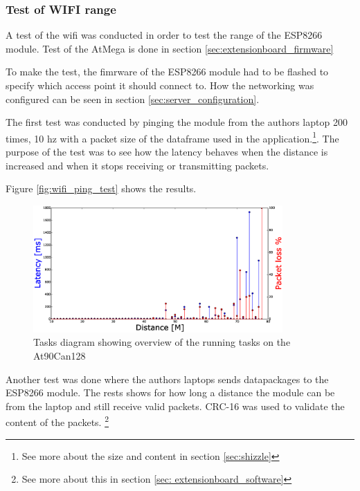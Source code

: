 \subsubsection*{Test of WIFI range}
A test of the wifi was conducted in order to test the range of the ESP8266 module. Test of the AtMega is done in section \ref{sec:extensionboard_firmware}

To make the test, the fimrware of the ESP8266 module had to be flashed to specify which access point it should connect to. How the networking was configured can be seen in section \ref{sec:server_configuration}.

The first test was conducted by pinging the module from the authors laptop 200 times, 10 hz with a packet size of the dataframe used in the application.\footnote{See more about the size and content in section \ref{sec:shizzle}}. The purpose of the test was to see how the latency behaves when the distance is increased and when it stops receiving or transmitting packets.

Figure \ref{fig:wifi_ping_test} shows the results.

\begin{figure}[H]
    \center
    \includegraphics[width=0.85\textwidth]{graphics/wifi_test_latency_1.eps}
  \caption{Tasks diagram showing overview of the running tasks on the At90Can128}
    \label{fig:wifi_pingtest}
\end{figure}

Another test was done where the authors laptops sends datapackages to the ESP8266 module. The rests shows for how long a distance the module can be from the laptop and still receive valid packets. CRC-16 was used to validate the content of the packets. \footnote{See more about this in section \ref{sec: extensionboard_software}}

